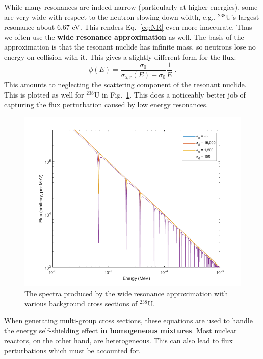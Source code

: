 \documentclass{article}
\begin{document}
While many resonances are indeed narrow (particularly at higher energies), some are very wide with respect to the neutron slowing down width, e.g., $^{238}$U's largest resonance about 6.67 eV. This renders Eq.~\eqref{eq:NR} even more inaccurate. Thus we often use the \textbf{wide resonance approximation} as well. The basis of the approximation is that the resonant nuclide has infinite mass, so neutrons lose no energy on collision with it. This gives a slightly different form for the flux:
\begin{equation}\label{eq:WR}
    \phi(E) =  \frac{\sigma_0}{\sigma_{\mathrm{a},r}(E) + \sigma_{0}}\frac{1}{E}\;\mathrm{.}
\end{equation}
This amounts to neglecting the scattering component of the resonant nuclide. This is plotted as well for $^{238}$U in Fig.~\ref{fig:WR}. This does a noticeably better job of capturing the flux perturbation caused by low energy resonances.

\begin{figure}[h!]
	\centering
	\includegraphics[scale=0.6]{./images/WR_238.png} 
	\caption{The spectra produced by the wide resonance approximation with various background cross sections of $^{238}$U.} 
	\label{fig:WR}
\end{figure}

When generating multi-group cross sections, these equations are used to handle the energy self-shielding effect \textbf{in homogeneous mixtures}. Most nuclear reactors, on the other hand, are heterogeneous. This can also lead to flux perturbations which must be accounted for.
\end{document}
